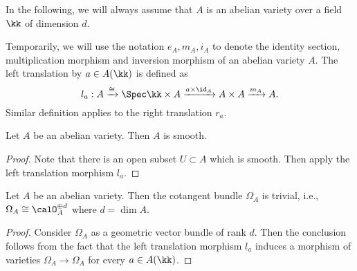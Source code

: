     \begin{example}\label{eg: product of abelian varieties as abelian varieties}
        
    \end{example}

    \begin{example}\label{eg: base change of abelian varieties as abelian varieties}
        
    \end{example}

    In the following, we will always assume that \(A\) is an abelian variety over a field \(\kk\) of dimension \(d\).

    Temporarily, we will use the notation \(e_A,m_A,i_A\) to denote the identity section, multiplication morphism and inversion morphism of an abelian variety \(A\).
    The left translation by \(a \in A(\kk)\) is defined as
    \[ l_a: A \xrightarrow{\cong} \Spec \kk \times A \xrightarrow{a \times \id_A} A \times A \xrightarrow{m_A} A. \]
    Similar definition applies to the right translation \(r_a\).

    \begin{proposition}\label{prop: abelian varieties are smooth}
        Let \( A \) be an abelian variety. 
        Then \( A \) is smooth.
    \end{proposition}
    \begin{proof}
        Note that there is an open subset \(U\subset A\) which is smooth.
        Then apply the left translation morphism \(l_a\).
    \end{proof}

    \begin{proposition}\label{prop: abelian varieties have trivial cotangent bundle}
        Let \( A \) be an abelian variety.
        Then the cotangent bundle \( \Omega_A \) is trivial, i.e., \(\Omega_A \cong \calO_A^{\oplus d}\) where \(d = \dim A\).
    \end{proposition}
    \begin{proof}
        Consider \(\Omega_A\) as a geometric vector bundle of rank \(d\).
        Then the conclusion follows from the fact that the left translation morphism \(l_a\) induces a morphism of varieties \(\Omega_A \to \Omega_A\) for every \(a \in A(\kk)\).
    \end{proof}


